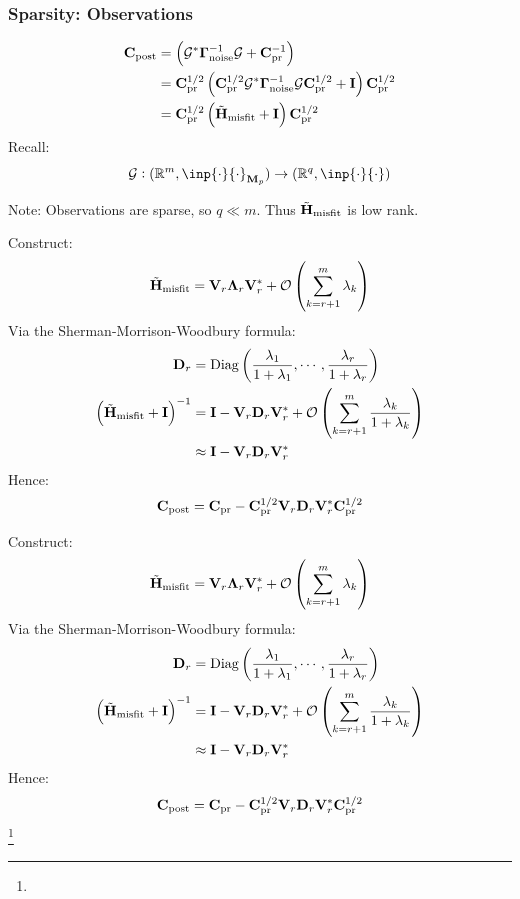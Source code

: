 \documentclass[
  pdf,
  10pt,
  xcolor={svgnames},
]{beamer}
\newcommand\blfootnote[1]{%
  \begingroup
  \renewcommand\thefootnote{}\footnote{#1}%
  \addtocounter{footnote}{-1}%
  \endgroup
}
\newcommand{\mc}[1]{\mathcal{#1}}
\newcommand{\R}{\mathbb{R}}
\newcommand{\mat}[1]{\mathbf{{#1}}}
\begin{document}
\begin{frame}
  \frametitle{Sparsity: Observations}
  \begin{align*}
    \mat{C}_{\rm post}
    &= 
    \left(
      \mc{G}^* \vb{\Gamma}_{\rm noise}^{-1} \mc{G} + \mat{C}_{\rm pr}^{-1}
    \right) \\
    &=
    \mat{C}_{\rm pr}^{1/2}
    \left(
      \mat{C}_{\rm pr}^{1/2}
      \mc{G}^* \vb{\Gamma}_{\rm noise}^{-1} \mc{G} 
      \mat{C}_{\rm pr}^{1/2}
      + \mat{I}
    \right) 
    \mat{C}_{\rm pr}^{1/2} \\
    &=
    \mat{C}_{\rm pr}^{1/2}
    \left(
      \tilde{\mat{H}}_{\rm misfit} + \mat{I}
    \right) 
    \mat{C}_{\rm pr}^{1/2}
  \end{align*}
  \pause
  Recall:
  \[
    \mc{G}:
    (\R^m, \inp{\cdot}{\cdot}_{\mat{M}_p}) \to (\R^q, \inp{\cdot}{\cdot})
  \]
  \begin{block}{Note:}
    Observations are sparse, so $q \ll m$. Thus $\tilde{\mat{H}}_{\rm misfit}$ is
    low rank.
  \end{block}
\end{frame}

\begin{frame}
  Construct:
  \[
    \tilde{\mat{H}}_{\rm misfit}
    = \mat{V}_r \mat{\Lambda}_r \mat{V}_r^*
    + \mc{O}\left( \sum_{k=r+1}^m \lambda_k \right)
  \]
  \pause
  Via the Sherman-Morrison-Woodbury formula:
  \begin{align*}
    \mat{D}_r
    &=
    {\rm Diag}\left(
      \frac{\lambda_1}{1+\lambda_1}, \cdots, \frac{\lambda_r}{1+\lambda_r}
    \right) \\
    \left(
      \tilde{\mat{H}}_{\rm misfit} + \mat{I}
    \right)^{-1}
    &= 
    \mat{I} - \mat{V}_r \mat{D}_r \mat{V}_r^*
    + \mc{O}\left( \sum_{k=r+1}^m \frac{\lambda_k}{1+\lambda_k} \right) \\
    &\approx
    \mat{I} - \mat{V}_r \mat{D}_r \mat{V}_r^*
  \end{align*}
  \pause
  Hence:
  \[
    \mat{C}_{\rm post}
    = 
    \mat{C}_{\rm pr} 
    - \mat{C}_{\rm pr}^{1/2} \mat{V}_r \mat{D}_r \mat{V}_r^* \mat{C}_{\rm pr}^{1/2}
  \]
\end{frame}
\begin{frame}
  Construct:
  \[
    \tilde{\mat{H}}_{\rm misfit}
    = \mat{V}_r \mat{\Lambda}_r \mat{V}_r^*
    + \mc{O}\left( \sum_{k=r+1}^m \lambda_k \right)
  \]
  Via the Sherman-Morrison-Woodbury formula:
  \begin{align*}
    \mat{D}_r
    &=
    {\rm Diag}\left(
      \frac{\lambda_1}{1+\lambda_1}, \cdots, \frac{\lambda_r}{1+\lambda_r}
    \right) \\
    \left(
      \tilde{\mat{H}}_{\rm misfit} + \mat{I}
    \right)^{-1}
    &= 
    \mat{I} - \mat{V}_r \mat{D}_r \mat{V}_r^*
    + \mc{O}\left( \sum_{k=r+1}^m \frac{\lambda_k}{1+\lambda_k} \right) \\
    &\approx
    \mat{I} - \mat{V}_r \mat{D}_r \mat{V}_r^*
  \end{align*}
  Hence:
  \[
    \mat{C}_{\rm post}
    = 
    \mat{C}_{\rm pr} 
    - \mat{C}_{\rm pr}^{1/2} \mat{V}_r \mat{D}_r \mat{V}_r^* \mat{C}_{\rm pr}^{1/2}
  \]
  \blfootnote{}
\end{frame}
\end{document}
